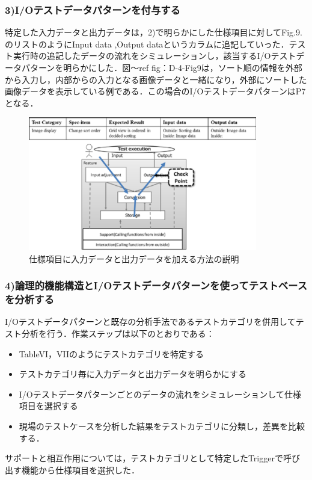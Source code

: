 \subsubsection{3)I/Oテストデータパターンを付与する}
特定した入力データと出力データは，2)で明らかにした仕様項目に対してFig.9.のリストのようにInput data ,Output dataというカラムに追記していった．テスト実行時の追記したデータの流れをシミュレーションし，該当するI/Oテストデータパターンを明らかにした．図〜ref {fig：D-4-Fig9}は，ソート順の情報を外部から入力し，内部からの入力となる画像データと一緒になり，外部にソートした画像データを表示している例である．この場合のI/OテストデータパターンはP7となる．

\begin{figure}[htbp]
\begin{center}
\includegraphics[width=10cm]{./image/D-4-Fig9.png}
\caption{仕様項目に入力データと出力データを加える方法の説明}
\label{fig:D-4-Fig9}
\end{center}
\end{figure}

\subsubsection{4)論理的機能構造とI/Oテストデータパターンを使ってテストベースを分析する}
I/Oテストデータパターンと既存の分析手法であるテストカテゴリを併用してテスト分析を行う．作業ステップは以下のとおりである：
\begin{itemize}
 \item TableVI，VIIのようにテストカテゴリを特定する
 \item テストカテゴリ毎に入力データと出力データを明らかにする
 \item I/Oテストデータパターンごとのデータの流れをシミュレーションして仕様項目を選択する
　\item 現場のテストケースを分析した結果をテストカテゴリに分類し，差異を比較する．
\end{itemize}
サポートと相互作用については，テストカテゴリとして特定したTriggerで呼び出す機能から仕様項目を選択した．

